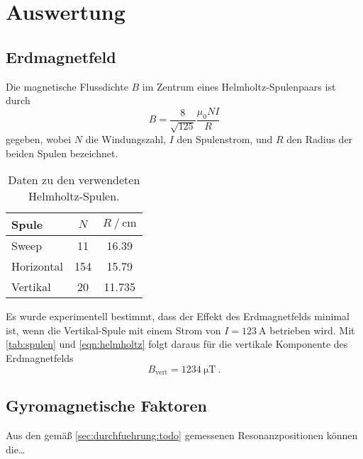 \section{Auswertung}
\label{sec:auswertung}

\subsection{Erdmagnetfeld}

Die magnetische Flussdichte $B$ im Zentrum eines Helmholtz-Spulenpaars ist durch
\begin{equation}
    B = \frac{8}{\sqrt{125}} \frac{\mu_0 NI}{R}
    \label{eqn:helmholtz}
\end{equation}
gegeben,
wobei $N$ die Windungszahl, $I$ den Spulenstrom, und $R$ den Radius der beiden Spulen bezeichnet. %

\begin{table}
    \centering
    \caption{Daten zu den verwendeten Helmholtz-Spulen.}
    \label{tab:spulen}
    \begin{tabular}{l S S}
        \toprule
        Spule &
        {$N$} &
        {$R \mathbin{/} \si{\centi\meter}$} \\
        \midrule
        Sweep      &  11 & 16.39  \\
        Horizontal & 154 & 15.79  \\
        Vertikal   &  20 & 11.735 \\
        \bottomrule
    \end{tabular}
\end{table}

Es wurde experimentell bestimmt,
dass der Effekt des Erdmagnetfelds minimal ist,
wenn die Vertikal-Spule mit einem Strom von $I = \SI{123}{\ampere}$ betrieben wird.
Mit \autoref{tab:spulen} und \autoref{eqn:helmholtz} folgt daraus für die vertikale Komponente des Erdmagnetfelds
\[ B_\text{vert} = \SI{1234}{\micro\tesla} \ . \]


\subsection{Gyromagnetische Faktoren}
Aus den gemäß \autoref{sec:durchfuehrung:todo} gemessenen Resonanzpositionen können die…

